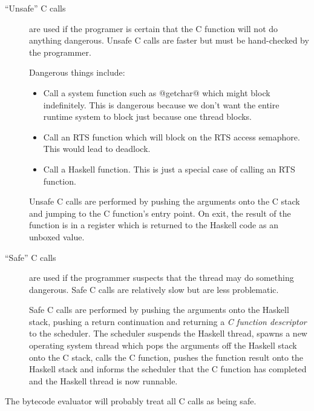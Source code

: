 \documentclass[11pt]{article}
\begin{document}
\begin{description}

\item[``Unsafe'' C calls] are used if the programer is certain that
the C function will not do anything dangerous.  Unsafe C calls are
faster but must be hand-checked by the programmer.

Dangerous things include:

\begin{itemize}

\item 

Call a system function such as @getchar@ which might block
indefinitely.  This is dangerous because we don't want the entire
runtime system to block just because one thread blocks.

\item

Call an RTS function which will block on the RTS access semaphore.
This would lead to deadlock.

\item

Call a Haskell function.  This is just a special case of calling an
RTS function.

\end{itemize}

Unsafe C calls are performed by pushing the arguments onto the C stack
and jumping to the C function's entry point.  On exit, the result of
the function is in a register which is returned to the Haskell code as
an unboxed value.

\item[``Safe'' C calls] are used if the programmer suspects that the
thread may do something dangerous.  Safe C calls are relatively slow
but are less problematic.

Safe C calls are performed by pushing the arguments onto the Haskell
stack, pushing a return continuation and returning a \emph{C function
descriptor} to the scheduler.  The scheduler suspends the Haskell thread,
spawns a new operating system thread which pops the arguments off the
Haskell stack onto the C stack, calls the C function, pushes the
function result onto the Haskell stack and informs the scheduler that
the C function has completed and the Haskell thread is now runnable.

\end{description}

The bytecode evaluator will probably treat all C calls as being safe.
\end{document}
